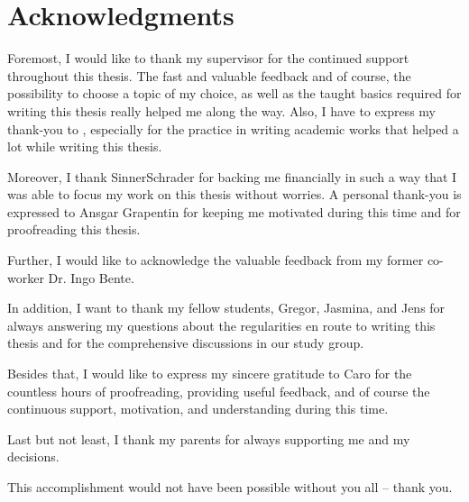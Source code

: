 \chapter*{Acknowledgments}
\thispagestyle{noheader}

Foremost, I would like to thank my supervisor \firstTutor{} for the continued support throughout this thesis. The fast and valuable feedback and of course, the possibility to choose a topic of my choice, as well as the taught basics required for writing this thesis really helped me along the way. Also, I have to express my thank-you to \secondTutor, especially for the practice in writing academic works that helped a lot while writing this thesis.

Moreover, I thank SinnerSchrader for backing me financially in such a way that I was able to focus my work on this thesis without worries. A personal thank-you is expressed to Ansgar Grapentin for keeping me motivated during this time and for proofreading this thesis.

Further, I would like to acknowledge the valuable feedback from my former co-worker Dr. Ingo Bente.

In addition, I want to thank my fellow students, Gregor, Jasmina, and Jens for always answering my questions about the regularities en route to writing this thesis and for the comprehensive discussions in our study group.

Besides that, I would like to express my sincere gratitude to Caro for the countless hours of proofreading, providing useful feedback, and of course the continuous support, motivation, and understanding during this time.

Last but not least, I thank my parents for always supporting me and my decisions.

This accomplishment would not have been possible without you all -- thank you.

\newpage